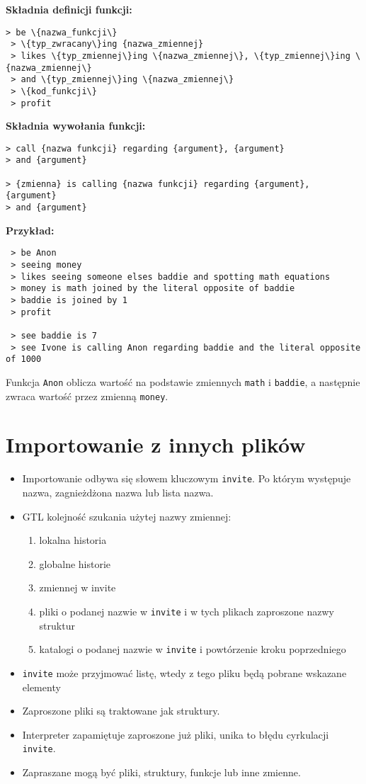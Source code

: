 \documentclass{article}
\begin{document}
\textbf{Składnia definicji funkcji:}
{\color{green}
\begin{Verbatim}[commandchars=\\\{\}]
 > be \{nazwa_funkcji\}
 > \{typ_zwracany\}ing {nazwa_zmiennej}
 > likes \{typ_zmiennej\}ing \{nazwa_zmiennej\}, \{typ_zmiennej\}ing \{nazwa_zmiennej\}
 > and \{typ_zmiennej\}ing \{nazwa_zmiennej\}
 > \{kod_funkcji\}
 > profit
\end{Verbatim}
}

\textbf{Składnia wywołania funkcji:}
{\color{green}
\begin{Verbatim}
> call {nazwa funkcji} regarding {argument}, {argument}
> and {argument}

> {zmienna} is calling {nazwa funkcji} regarding {argument}, {argument}
> and {argument}
\end{Verbatim}
}

\textbf{Przykład:}
{\color{green}
\begin{Verbatim}
 > be Anon
 > seeing money
 > likes seeing someone elses baddie and spotting math equations
 > money is math joined by the literal opposite of baddie
 > baddie is joined by 1
 > profit

 > see baddie is 7
 > see Ivone is calling Anon regarding baddie and the literal opposite of 1000
\end{Verbatim}
}



Funkcja \texttt{Anon} oblicza wartość na podstawie zmiennych \texttt{math} i \texttt{baddie}, a następnie zwraca wartość przez zmienną \texttt{money}.

\section{Importowanie z innych plików}
\begin{itemize}
    \item Importowanie odbywa się słowem kluczowym \texttt{invite}. Po którym występuje nazwa, zagnieżdżona nazwa lub lista nazwa.
    \item GTL kolejność szukania użytej nazwy zmiennej:
    \begin{enumerate}
        \item lokalna historia
        \item globalne historie
        \item zmiennej w invite
        \item pliki o podanej nazwie w \texttt{invite} i w tych plikach zaproszone nazwy struktur
        \item katalogi o podanej nazwie w \texttt{invite} i powtórzenie kroku poprzedniego
    \end{enumerate}
    \item \texttt{invite} może przyjmować listę, wtedy z tego pliku będą pobrane wskazane elementy
    \item Zaproszone pliki są traktowane jak struktury.
    \item Interpreter zapamiętuje zaproszone już pliki, unika to błędu cyrkulacji \texttt{invite}.
    \item Zapraszane mogą być pliki, struktury, funkcje lub inne zmienne.
\end{itemize}
\end{document}
